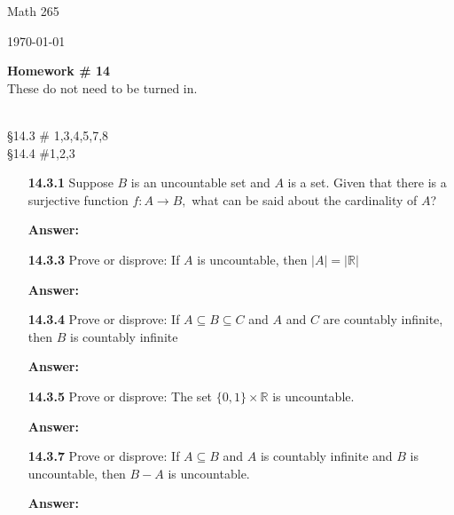 \documentclass[11pt]{report}
\theoremstyle{plain}
\newcommand{\R}{\mathbb{R}}
\begin{document}
\hfill Math 265


\hfill \today

\begin{center}
\Large{\textbf{Homework \# 14}} \\
These do not need to be turned in.
\end{center}

\noindent{} \\ \S 14.3 \# 1,3,4,5,7,8\\
\S 14.4 \#1,2,3

\begin{enumerate}
\item[\textbf{14.3.1}] Suppose $B$ is an uncountable set and $A$ is a set. Given that there is a surjective function $f : A \to B,$ what can be said about the cardinality of $A$?

\textbf{Answer:} \\

\vspace{1in}

\item[\textbf{14.3.3}]  Prove or disprove: If $A$ is uncountable, then $|A| = |\R|$

\textbf{Answer:} \\

\vspace{1in}

\item[\textbf{14.3.4}] Prove or disprove: If $A \subseteq B \subseteq C$ and $A$ and $C$ are countably infinite, then $B$ is countably infinite

\textbf{Answer:} \\

\vspace{1in}

\item[\textbf{14.3.5}] Prove or disprove: The set $\{0,1\} \times \R$ is uncountable.

\textbf{Answer:} \\

\vspace{1in}

\item[\textbf{14.3.7}] Prove or disprove: If $A \subseteq B$ and $A$ is countably infinite and $B$ is uncountable, then $B - A$ is uncountable.

\textbf{Answer:} \\


\end{enumerate}
\end{document}
